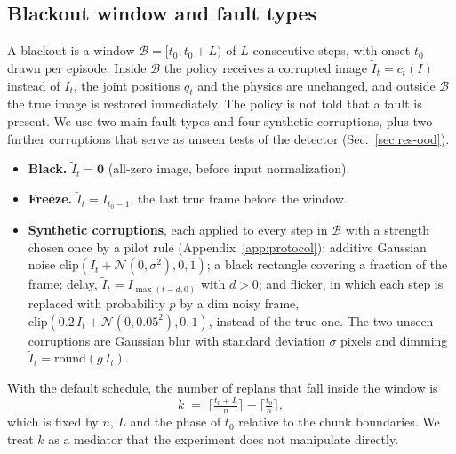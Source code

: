 \documentclass[11pt]{article}
\begin{document}
\subsection{Blackout window and fault types}
\label{sec:blackout}
A blackout is a window $\mathcal B=[t_0,t_0+L)$ of $L$ consecutive steps, with onset $t_0$ drawn per episode. Inside $\mathcal B$ the policy receives a corrupted image $\tilde I_t=c_t(I)$ instead of $I_t$, the joint positions $q_t$ and the physics are unchanged, and outside $\mathcal B$ the true image is restored immediately. The policy is not told that a fault is present. We use two main fault types and four synthetic corruptions, plus two further corruptions that serve as unseen tests of the detector (Sec.~\ref{sec:res-ood}).
\begin{itemize}\itemsep0pt
  \item \textbf{Black.} $\tilde I_t=\mathbf 0$ (all-zero image, before input normalization).
  \item \textbf{Freeze.} $\tilde I_t=I_{t_0-1}$, the last true frame before the window.
  \item \textbf{Synthetic corruptions}, each applied to every step in $\mathcal B$ with a strength chosen once by a pilot rule (Appendix~\ref{app:protocol}): additive Gaussian noise $\mathrm{clip}(I_t+\mathcal N(0,\sigma^2),0,1)$; a black rectangle covering a fraction of the frame; delay, $\tilde I_t=I_{\max(t-d,0)}$ with $d>0$; and flicker, in which each step is replaced with probability $p$ by a dim noisy frame, $\mathrm{clip}(0.2\,I_t+\mathcal N(0,0.05^2),0,1)$, instead of the true one. The two unseen corruptions are Gaussian blur with standard deviation $\sigma$ pixels and dimming $\tilde I_t=\mathrm{round}(g\,I_t)$.
\end{itemize}
With the default schedule, the number of replans that fall inside the window is
\begin{equation}
  k \;=\; \Big\lceil \tfrac{t_0+L}{n}\Big\rceil-\Big\lceil \tfrac{t_0}{n}\Big\rceil ,
  \label{eq:k}
\end{equation}
which is fixed by $n$, $L$ and the phase of $t_0$ relative to the chunk boundaries. We treat $k$ as a mediator that the experiment does not manipulate directly.
\end{document}
